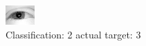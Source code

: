 \begin{figure}[h!]
\begin{center}
\includegraphics[width=0.60\columnwidth]{figures/ID2387_class_2_target_3.png}
\end{center}
\caption{ Classification: 2 actual target: 3}
\label{fig:ID2387_class_2_target_3}
\end{figure}
